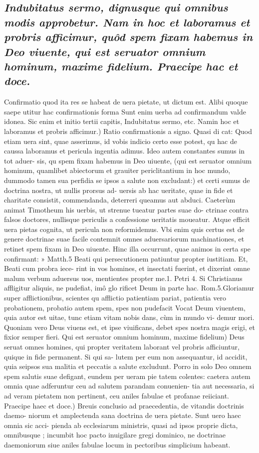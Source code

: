 \documentclass{article}
\begin{document}
\begin{pages}
\subsection*{\textit{Indubitatus sermo, dignusque qui omnibus modis approbetur. Nam in hoc et laboramus et probris afficimur, quôd spem fixam habemus in Deo viuente, qui est seruator omnium hominum, maxime fidelium. Praecipe hac et doce. }}\pstart Confirmatio quod ita res se habeat de uera pietate, ut dictum est. Alibi quoque saepe utitur hac confirmationis forma Sunt enim uerba ad confirmandum valde idonea. Sic enim et initio tertii capitis, Indubitatus sermo, etc.  \pend\pstart Namin hoc et laboramus et probris afficimur.) Ratio confirmationis a signo. Quasi di cat: Quod etiam uera sint, quae asserimus, id vobis indicio certo esse potest, qu hac de caussa laboramus et pericula ingentia adimus. Ideo autem constantes sumus in tot aduer- sis, qu spem fixam habemus in Deo uiuente, (qui est seruator omnium hominum, quamlibet abiectorum et grauiter periclitantium in hoc mundo, dummodo tamen sua perfidia se ipsos a salute non excludant:) et certi sumus de doctrina nostra, ut nullis prorsus ad- uersis ab hac ueritate, quae in fide et charitate consistit, commendanda, deterreri queamus aut abduci. Caeterùm animat Timotheum his uerbis, ut strenue tueatur partes suae do- ctrinae contra falsos doctores, nullisque periculis a confessione ueritatis moueatur. Atque  efficit uera pietas cognita, ut pericula non reformidemus. Vbi enim quis certus est de genere doctrinae suae facile contemnit omnes aduersariorum machinationes, et retinet spem fixam in Deo uiuente. Hinc illa occurrunt, quae animos in certa spe confirmant: » Matth.5 Beati qui persecutionem patiuntur propter iustitiam. Et, Beati cum probra iece-  rint in vos homines, et insectati fuerint, et dixerint omne malum verbum aduersus uos,  mentientes propter me.1. Petri 4. Si Christianus affligitur aliquis, ne pudefiat, imô glo  rificet Deum in parte hac. Rom.5.Gloriamur super afflictionibus, scientes qu afflictio  patientiam pariat, patientia vero probationem, probatio autem spem, spes non pudefacit Vocat Deum viuentem, quia autor est uitae, tunc etiam vitam nobis dans, cùm in mundo vi- demur mori. Quoniam vero Deus viuens est, et ipse viuificans, debet spes nostra magis erigi, et fixior semper fieri.  \pend\pstart Qui est seruator omnium hominum, maxime fidelium) Deus seruat omnes homines, qui propter veritatem laborant vel probris afficiuntur, quique in fide permanent. Si qui sa- lutem per eum non assequantur, id accidit, quia seipsos sua malitia et peccatis a salute excludunt. Porro in solo Deo omnem spem salutis suae defigant, eundem per ueram pie tatem colentes: caetera autem omnia quae adferuntur ceu ad salutem parandam conuenien- tia aut necessaria, si ad veram pietatem non pertinent, ceu aniles fabulae et profanae reiiciant.  \pend\pstart Praecipe haec et doce.) Breuis conclusio ad praecedentia, de vitandis doctrinis daemo- niorum et amplectenda sana doctrina de uera pietate. Sunt uero haec omnia sic acci- pienda ab ecclesiarum ministris, quasi ad ipsos proprie dicta, omnibusque ; incumbit hoc pacto inuigilare gregi dominico, ne doctrinae daemoniorum siue aniles fabulae locum in pectoribus simplicium habeant.  \pend

\end{pages}
\end{document}
